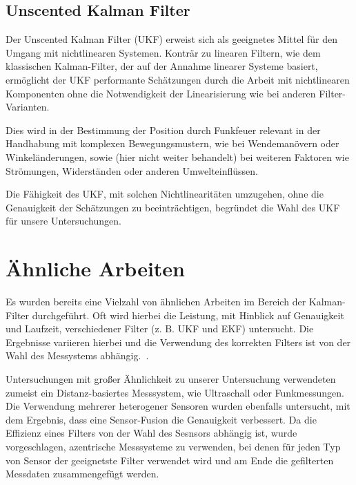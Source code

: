 \documentclass[conference]{IEEEtran}[10pt]
\begin{document}
\subsection{Unscented Kalman Filter}

Der Unscented Kalman Filter (UKF) erweist sich als geeignetes Mittel für den Umgang mit nichtlinearen Systemen. Konträr zu linearen Filtern, wie dem klassischen Kalman-Filter, der auf der Annahme linearer Systeme basiert, ermöglicht der UKF performante Schätzungen durch die Arbeit mit nichtlinearen Komponenten ohne die Notwendigkeit der Linearisierung wie bei anderen Filter-Varianten.

Dies wird in der Bestimmung der Position durch Funkfeuer relevant in der Handhabung mit komplexen Bewegungsmustern, wie bei Wendemanövern oder Winkeländerungen, sowie (hier nicht weiter behandelt) bei weiteren Faktoren wie Strömungen, Widerständen oder anderen Umwelteinflüssen.

Die Fähigkeit des UKF, mit solchen Nichtlinearitäten umzugehen, ohne die Genauigkeit der Schätzungen zu beeinträchtigen, begründet die Wahl des UKF für unsere Untersuchungen.

\section{Ähnliche Arbeiten}
Es wurden bereits eine Vielzahl von ähnlichen Arbeiten im Bereich der Kalman-Filter durchgeführt. Oft wird hierbei die Leistung, mit Hinblick auf Genauigkeit und Laufzeit, verschiedener Filter (z. B. UKF und EKF) untersucht. Die Ergebnisse variieren hierbei und die Verwendung des korrekten Filters ist von der Wahl des Messystems abhängig.~\cite{st2004comparison, laviola2003comparison, bordoy2016bank}.

Untersuchungen mit großer Ähnlichkeit zu unserer Untersuchung verwendeten zumeist ein Distanz-basiertes Messsystem, wie Ultraschall oder Funkmessungen.\cite{caceres2009adaptive, deng2018adaptive, khan2014localization, bordoy2016bank} Die Verwendung mehrerer heterogener Sensoren wurden ebenfalls untersucht, mit dem Ergebnis, dass eine Sensor-Fusion die Genauigkeit verbessert. Da die Effizienz eines Filters von der Wahl des Sesnsors abhängig ist, wurde vorgeschlagen, azentrische Messsysteme zu verwenden, bei denen für jeden Typ von Sensor der geeignetste Filter verwendet wird und am Ende die gefilterten Messdaten zusammengefügt werden.~\cite{st2004comparison}
\end{document}
